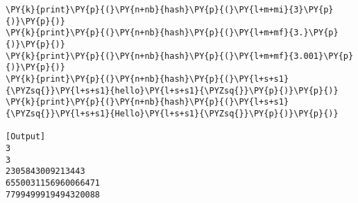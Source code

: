 \begin{Verbatim}[label=\makebox{\url{https://bitbucket.org/lbaldini/programming/src/tip/snippets/hashing.py}},commandchars=\\\{\}]
\PY{k}{print}\PY{p}{(}\PY{n+nb}{hash}\PY{p}{(}\PY{l+m+mi}{3}\PY{p}{)}\PY{p}{)}
\PY{k}{print}\PY{p}{(}\PY{n+nb}{hash}\PY{p}{(}\PY{l+m+mf}{3.}\PY{p}{)}\PY{p}{)}
\PY{k}{print}\PY{p}{(}\PY{n+nb}{hash}\PY{p}{(}\PY{l+m+mf}{3.001}\PY{p}{)}\PY{p}{)}
\PY{k}{print}\PY{p}{(}\PY{n+nb}{hash}\PY{p}{(}\PY{l+s+s1}{\PYZsq{}}\PY{l+s+s1}{hello}\PY{l+s+s1}{\PYZsq{}}\PY{p}{)}\PY{p}{)}
\PY{k}{print}\PY{p}{(}\PY{n+nb}{hash}\PY{p}{(}\PY{l+s+s1}{\PYZsq{}}\PY{l+s+s1}{Hello}\PY{l+s+s1}{\PYZsq{}}\PY{p}{)}\PY{p}{)}

[Output]
3
3
2305843009213443
6550031156960066471
7799499919494320088
\end{Verbatim}